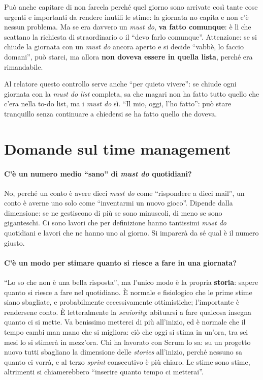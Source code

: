 Può anche capitare di non farcela perché quel giorno sono arrivate così tante cose
urgenti e importanti da rendere inutili le stime: la giornata no capita e non c'è
nessun problema. Ma se era davvero un \emph{must do}, \textbf{va fatto comunque}:
è lì che scattano la richiesta di straordinario o il ``devo farlo comunque''.
Attenzione: se si chiude la giornata con un \emph{must do} ancora aperto e si
decide ``vabbè, lo faccio domani'', può starci, ma allora \textbf{non doveva essere
in quella lista}, perché era rimandabile.

Al relatore questo controllo serve anche ``per quieto vivere'': se chiude ogni
giornata con la \emph{must do list} completa, sa che magari non ha fatto tutto
quello che c'era nella to-do list, ma i \emph{must do} sì. ``Il mio, oggi, l'ho
fatto'': può stare tranquillo senza continuare a chiedersi se ha fatto quello che
doveva.

\section{Domande sul time management}
\label{sec:z2-qa-tempo}

\paragraph{C'è un numero medio ``sano'' di \emph{must do} quotidiani?} No, perché un
conto è avere dieci \emph{must do} come ``rispondere a dieci mail'', un conto è
averne uno solo come ``inventarmi un nuovo gioco''. Dipende dalla dimensione: se ne
gestiscono di più se sono minuscoli, di meno se sono giganteschi. Ci sono lavori
che per definizione hanno tantissimi \emph{must do} quotidiani e lavori che ne hanno
uno al giorno. Si imparerà da sé qual è il numero giusto.

\paragraph{C'è un modo per stimare quanto si riesce a fare in una giornata?} ``Lo so
che non è una bella risposta'', ma l'unico modo è la propria \textbf{storia}:
sapere quanto si riesce a fare nel quotidiano. È normale e fisiologico che le
prime stime siano sbagliate, e probabilmente eccessivamente ottimistiche;
l'importante è rendersene conto. È letteralmente la \emph{seniority}: abituarsi a
fare qualcosa insegna quanto ci si mette. Va benissimo metterci di più all'inizio,
ed è normale che il tempo cambi man mano che si migliora: ciò che oggi si stima in
un'ora, tra sei mesi lo si stimerà in mezz'ora. Chi ha lavorato con Scrum lo sa:
su un progetto nuovo tutti sbagliano la dimensione delle \emph{stories} all'inizio,
perché nessuno sa quanto ci vorrà, e al terzo \emph{sprint} consecutivo è più
chiaro. Le stime sono stime, altrimenti si chiamerebbero ``inserire quanto tempo ci
metterai''.

